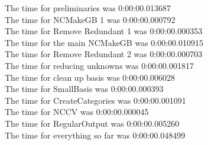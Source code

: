 \documentclass[rep10,leqno]{report}
\begin{document}
\noindent
The time for preliminaries was 0:00:00.013687\\
The time for NCMakeGB 1 was 0:00:00.000792\\
The time for Remove Redundant 1 was 0:00:00.000353\\
The time for the main NCMakeGB was 0:00:00.010915\\
The time for Remove Redundant 2 was 0:00:00.000703\\
The time for reducing unknowns was 0:00:00.001817\\
The time for clean up basis was 0:00:00.006028\\
The time for SmallBasis was 0:00:00.000393\\
The time for CreateCategories was 0:00:00.001091\\
The time for NCCV was 0:00:00.000045\\
The time for RegularOutput was 0:00:00.005260\\
The time for everything so far was 0:00:00.048499\\
\end{document}
